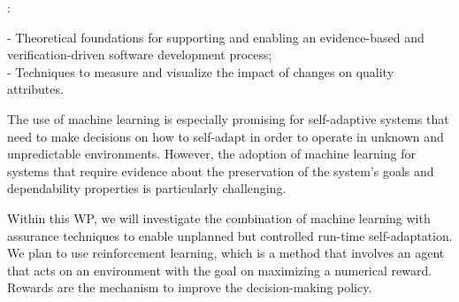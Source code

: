 \documentclass[12pt]{article}
\begin{document}
:
 
 - Theoretical foundations for supporting and enabling an evidence-based and verification-driven software development process;\\
 - Techniques  to measure and visualize the impact of changes on quality attributes.

\vspace{.2cm}


\noindent The use of machine learning is
especially promising for self-adaptive systems that 
need to make decisions on how to self-adapt in order to operate in %
 unknown and 
unpredictable environments. %
However, the adoption of machine learning for systems that require evidence about the preservation of the system's goals and dependability properties is particularly challenging.  

Within this WP, we will investigate the combination of 
machine learning  with assurance techniques to enable unplanned but controlled run-time self-adaptation.
We plan to use reinforcement learning, which is 
a method that involves
an agent that acts on an environment with the goal on maximizing a numerical reward. %
Rewards are the mechanism to %
improve the decision-making policy.
\end{document}
